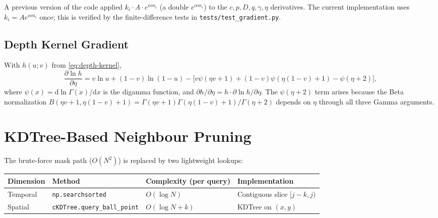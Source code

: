 \documentclass[11pt,a4paper]{article}
\theoremstyle{plain}
\theoremstyle{definition}
\newcommand{\dd}{\mathrm{d}}
\begin{document}
\begin{remark}
A previous version of the code applied $k_i\cdot A\cdot e^{\alpha m_i}$ (a
double $e^{\alpha m_i}$) to the $c,p,D,q,\gamma,\eta$ derivatives. The
current implementation uses $k_i=A e^{\alpha m_i}$ once; this is verified by
the finite-difference tests in \texttt{tests/test\_gradient.py}.
\end{remark}

\subsection{Depth Kernel Gradient}\label{sec:depth-grad}

With $h(u;v)$ from \eqref{eq:depth-kernel},
\begin{equation}\label{eq:depth-grad}
\frac{\partial\ln h}{\partial\eta}
= v\ln u+(1-v)\ln(1-u)
  -\bigl[v\psi(\eta v+1)+(1-v)\psi(\eta(1-v)+1)-\psi(\eta+2)\bigr],
\end{equation}
where $\psi(x)=\dd\ln\Gamma(x)/\dd x$ is the digamma function, and
$\partial h/\partial\eta = h\cdot\partial\ln h/\partial\eta$.
The $\psi(\eta+2)$ term arises because the Beta normalization
$B(\eta v+1,\eta(1-v)+1)=\Gamma(\eta v+1)\Gamma(\eta(1-v)+1)/\Gamma(\eta+2)$
depends on $\eta$ through all three Gamma arguments.

\section{KDTree-Based Neighbour Pruning}\label{sec:kdtree}

The brute-force mask path ($O(N^2)$) is replaced by two lightweight lookups:

\begin{center}
\begin{tabular}{@{}llll@{}}
\toprule
Dimension & Method & Complexity (per query) & Implementation\\
\midrule
Temporal & \texttt{np.searchsorted} & $O(\log N)$ & Contiguous slice $[j-k,j)$\\
Spatial  & \texttt{cKDTree.query\_ball\_point} & $O(\log N+k)$ & KDTree on $(x,y)$\\
\bottomrule
\end{tabular}
\end{center}
\end{document}

